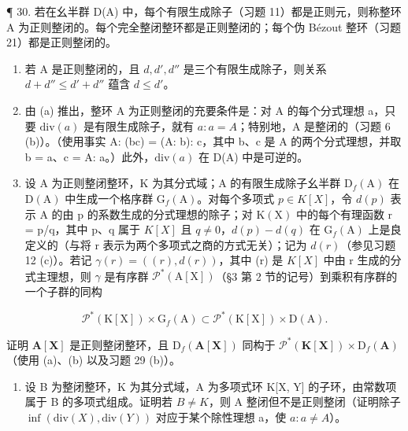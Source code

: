 ¶ 30. 若在幺半群 D(A) 中，每个有限生成除子（习题 11）都是正则元，则称整环 A 为正则整闭的。每个完全整闭整环都是正则整闭的；每个伪 Bézout 整环（习题 21）都是正则整闭的。

\begin{enumerate}
\def\labelenumi{(\alph{enumi})}
\item
  若 A 是正则整闭的，且 \(d, d', d''\) 是三个有限生成除子，则关系 \(d + d'' \leqslant d' + d''\) 蕴含 \(d \leqslant d'\)。
\item
  由 (a) 推出，整环 A 为正则整闭的充要条件是：对 A 的每个分式理想 a，只要 \(\text{div}(a)\) 是有限生成除子，就有 \(a: a = A\)；特别地，A 是整闭的（习题 6 (b)）。（使用事实 A: (bc) = (A: b): c，其中 b、c 是 A 的两个分式理想，并取 b = a、c = A: a。）此外，\(\text{div}(a)\) 在 D(A) 中是可逆的。
\item
  设 A 为正则整闭整环，K 为其分式域；A 的有限生成除子幺半群 \(\mathrm{D}_{f}(\mathrm{A})\) 在 \(\mathrm{D}(\mathrm{A})\) 中生成一个格序群 \(\mathrm{G}_{f}(\mathrm{A})\)。对每个多项式 \(p \in K[X]\)，令 \(d(p)\) 表示 A 的由 p 的系数生成的分式理想的除子；对 \(\mathrm{K}(\mathrm{X})\) 中的每个有理函数 r = p/q，其中 p、q 属于 \(K[X]\) 且 \(q \neq 0\)，\(d(p) - d(q)\) 在 \(\mathrm{G}_{f}(\mathrm{A})\) 上是良定义的（与将 r 表示为两个多项式之商的方式无关）；记为 \(d(r)\)（参见习题 12 (c)）。若记 \(\gamma(r) = ((r), d(r))\)，其中 (r) 是 \(K[X]\) 中由 r 生成的分式主理想，则 \(\gamma\) 是有序群 \(\mathcal{P}^{*}(\mathrm{A}[\mathrm{X}])\)（§3 第 2 节的记号）到乘积有序群的一个子群的同构
\end{enumerate}

\[
\mathscr {P} ^ {*} (\mathrm{K} [ \mathrm{X} ]) \times \mathrm{G} _ {f} (\mathrm{A}) \subset \mathscr {P} ^ {*} (\mathrm{K} [ \mathrm{X} ]) \times \mathrm{D} (\mathrm{A}).
\]

证明 \(\mathbf{A}[\mathbf{X}]\) 是正则整闭整环，且 \(\mathrm{D}_f(\mathbf{A}[\mathbf{X}])\) 同构于 \(\mathcal{P}^* (\mathbf{K}[\mathbf{X}])\times \mathrm{D}_f(\mathbf{A})\)（使用 (a)、(b) 以及习题 29 (b)）。

\begin{enumerate}
\def\labelenumi{(\alph{enumi})}
\setcounter{enumi}{3}
\tightlist
\item
  设 B 为整闭整环，K 为其分式域，A 为多项式环 K{[}X, Y{]} 的子环，由常数项属于 B 的多项式组成。证明若 \(B \neq K\)，则 A 整闭但不是正则整闭（证明除子 \(\inf(\text{div}(X), \text{div}(Y))\) 对应于某个除性理想 a，使 \(a: a \neq A\)）。
\end{enumerate}

